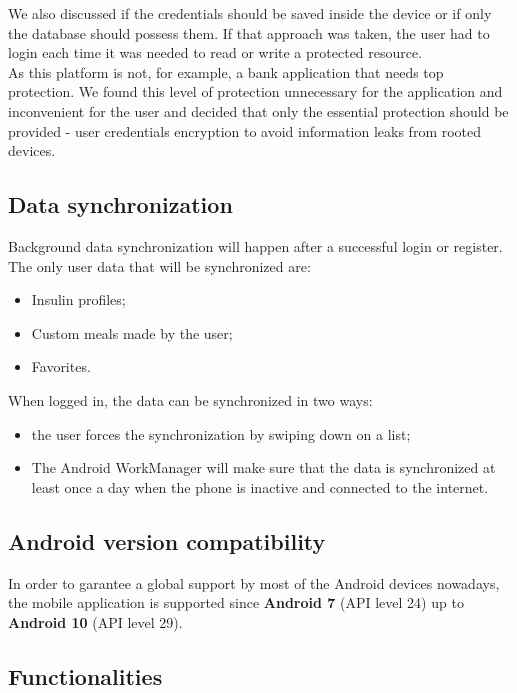 We also discussed if the credentials should be saved inside the device or if only the database should possess them.
If that approach was taken, the user had to login each time it was needed to read or write a protected resource.\\

As this platform is not, for example, a bank application that needs top protection. We found this level of protection
unnecessary for the application and inconvenient for the user and decided that only the essential protection should be provided - 
user credentials encryption to avoid information leaks from rooted devices.

\subsection{Data synchronization}

Background data synchronization will happen after a successful login or register. The only user data that will be synchronized are:
\begin{itemize}
    \item Insulin profiles;
    \item Custom meals made by the user;
    \item Favorites.
\end{itemize}

When logged in, the data can be synchronized in two ways:
\begin{itemize}
    \item the user forces the synchronization by swiping down on a list;
    \item The Android WorkManager will make sure that the data is synchronized at least once a 
    day when the phone is inactive and connected to the internet.    
\end{itemize}

\subsection{Android version compatibility}

In order to garantee a global support by most of the Android devices nowadays, the mobile application is supported since \textbf{Android 7} (API level 24)
up to \textbf{Android 10} (API level 29).

\subsection{Functionalities}

